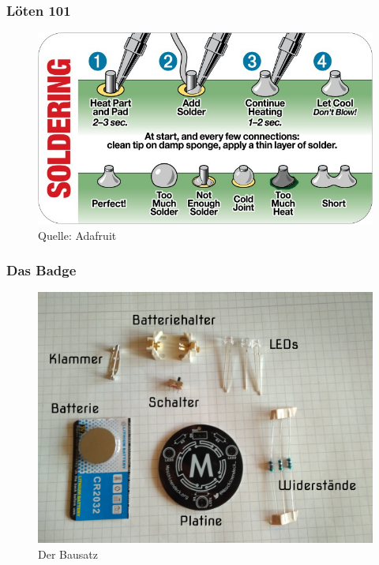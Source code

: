 \documentclass[10pt]{beamer}
\begin{document}
    \begin{frame}
        \frametitle{Löten 101}
        \begin{figure}[hbtp]
            \centering
            \includegraphics[width=\linewidth]{images/solder.png}
            \caption{Quelle: Adafruit}
        \end{figure}
    \end{frame}


    \begin{frame}
        \frametitle{Das Badge}
        \begin{figure}[hbtp]
            \centering
            \includegraphics[width=\linewidth]{images/badge.jpg}
            \caption{Der Bausatz}
        \end{figure}
    \end{frame}

    
\end{document}
